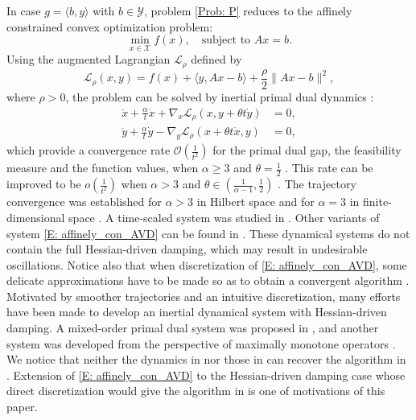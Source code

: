 \documentclass[pdflatex,sn-mathphys-num]{sn-jnl}
\theoremstyle{thmstyleone}
\theoremstyle{thmstyletwo}
\theoremstyle{thmstylethree}
\newcommand{\X}{\mathcal{X}}
\newcommand{\Y}{\mathcal{Y}}
\begin{document}
In case $g=\langle b, y \rangle$ with $b\in \Y$, problem \eqref{Prob: P} reduces to the affinely constrained convex optimization problem:
\begin{equation}\label{Prob: min_fx}
\min_{x\in\X} f(x),\quad
\text{subject to } Ax = b.
\end{equation}
Using the augmented Lagrangian $\mathcal{L}_\rho$ defined by 
\begin{equation}\label{E: Lm}
\mathcal{L}_\rho(x,y) = f(x) + \langle y, Ax-b \rangle + \frac{\rho}{2}\| Ax-b \|^2,
\end{equation}
where $\rho>0$, the problem can be solved by inertial primal dual dynamics \cite{Zeng_2023}:
\begin{equation}\label{E: affinely_con_AVD}
\begin{aligned}
\ddot{x} + \frac{\alpha}{t}\dot{x} + \nabla_x\mathcal{L}_\rho( x, y+\theta t \dot{y} ) &= 0,\\
\ddot{y} + \frac{\alpha}{t}\dot{y} - \nabla_y\mathcal{L}_\rho(x+\theta t\dot{x},y ) &= 0,
\end{aligned}
\end{equation} 
which provide a convergence rate $\mathcal{O}\left( \frac{1}{t^2} \right)$ for the primal dual gap, the feasibility measure and the function values, when $\alpha\ge 3$ and $\theta=\frac{1}{2}$ \cite{Zeng_2023,Radu_2021}. This rate can be improved to be $o\left( \frac{1}{t^2} \right)$ when $\alpha>3$ and $\theta\in\left( \frac{1}{\alpha-1}, \frac{1}{2} \right)$ \cite{He_2026_affine_dynamics}. The trajectory convergence was established for $\alpha>3$ in Hilbert space \cite{Radu_2021} and for $\alpha=3$ in finite-dimensional space \cite{He_2026_affine_dynamics}.  A time-scaled system was studied in \cite{Hulett_2023}. Other variants of system \eqref{E: affinely_con_AVD} can be found in \cite{He_2021,He_2022_TAC,He_2022_AUTO,Attouch_2022_ADMM}. These dynamical systems do not contain the full Hessian-driven damping, which may result in undesirable oscillations. Notice also that when discretization of \eqref{E: affinely_con_AVD}, some delicate approximations have to be made so as to obtain a convergent algorithm \cite{Radu_2023,He_2026_affine_algo}. Motivated by smoother trajectories and an intuitive discretization, many efforts have been made to develop an inertial dynamical system with Hessian-driven damping. A mixed-order primal dual system was proposed in \cite{He_2025}, and another system was developed from the perspective of maximally monotone operators \cite{Radu_2025_OGDA}. We notice that neither the dynamics in \cite{He_2025} nor those in \cite{Radu_2025_OGDA} can recover the algorithm in \cite{Radu_2023}. Extension of \eqref{E: affinely_con_AVD} to the Hessian-driven damping case whose direct discretization would give the algorithm in \cite{Radu_2023} is one of motivations of this paper.        
\end{document}
